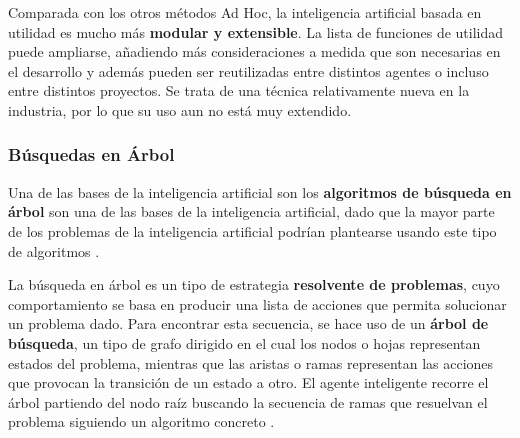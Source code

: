 Comparada con los otros métodos Ad Hoc, la inteligencia artificial basada en utilidad es mucho más \textbf{modular y extensible}. La lista de funciones de utilidad puede ampliarse, añadiendo más consideraciones a medida que son necesarias en el desarrollo y además pueden ser reutilizadas entre distintos agentes o incluso entre distintos proyectos. Se trata de una técnica relativamente nueva en la industria, por lo que su uso aun no está muy extendido.

\subsubsection{Búsquedas en Árbol}
Una de las bases de la inteligencia artificial son los \textbf{algoritmos de búsqueda en árbol} son una de las bases de la inteligencia artificial, dado que la mayor parte de los problemas de la inteligencia artificial podrían plantearse usando este tipo de algoritmos \cite{ai_and_games}.

La búsqueda en árbol es un tipo de estrategia \textbf{resolvente de problemas}, cuyo comportamiento se basa en producir una lista de acciones que permita solucionar un problema dado. Para encontrar esta secuencia, se hace uso de un \textbf{árbol de búsqueda}, un tipo de grafo dirigido en el cual los nodos o hojas representan estados del problema, mientras que las aristas o ramas representan las acciones que provocan la transición de un estado a otro. El agente inteligente recorre el árbol partiendo del nodo raíz buscando la secuencia de ramas que resuelvan el problema siguiendo un algoritmo concreto \cite{ia_moderno}. 

